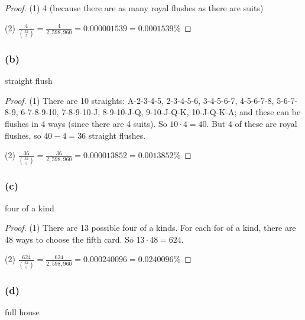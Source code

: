 \documentclass[14pt]{extarticle}
\newcommand{\dps}{\displaystyle}
\begin{document}
\begin{proof}
     (1) 4 (because there are as many royal flushes as there are suits)

     (2) \(\dps \frac{4}{\binom{52}{5}} = \frac{4}{2,598,960} = 0.000001539 = 0.0001539\%\)
\end{proof}

\subsubsection{(b)}
straight flush

\begin{proof}
     (1) There are 10 straights: A-2-3-4-5, 2-3-4-5-6, 3-4-5-6-7, 4-5-6-7-8, 5-6-7-8-9, 6-7-8-9-10, 7-8-9-10-J, 8-9-10-J-Q,
     9-10-J-Q-K, 10-J-Q-K-A; and these can be flushes in 4 ways (since there are 4 suits). So \(10 \cdot 4 = 40\). But 4 of
     these are royal flushes, so \(40 - 4 = 36\) straight flushes.

     (2) \(\dps \frac{36}{\binom{52}{5}} = \frac{36}{2,598,960} = 0.000013852 = 0.0013852\%\)
\end{proof}

\subsubsection{(c)}
four of a kind

\begin{proof}
     (1) There are 13 possible four of a kinds. For each for of a kind, there are 48 ways to choose the fifth card.
     So \(13 \cdot 48 = 624\).

     (2) \(\dps \frac{624}{\binom{52}{5}} = \frac{624}{2,598,960} = 0.000240096 = 0.0240096\%\)
\end{proof}

\subsubsection{(d)}
full house
\end{document}
